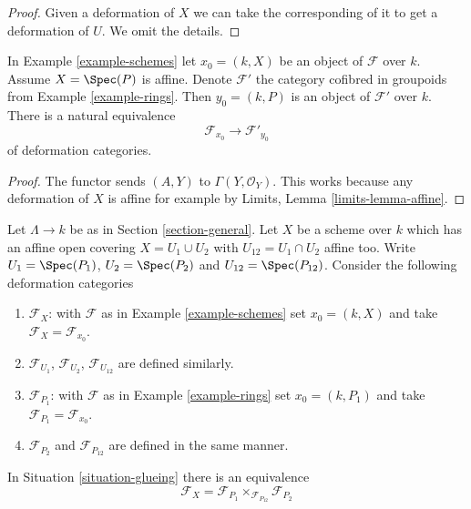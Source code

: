 \begin{proof}
Given a deformation of $X$ we can take the corresponding
of it to get a deformation of $U$. We omit the details.
\end{proof}

\begin{lemma}
\label{lemma-affine}
In Example \ref{example-schemes} let $x_0 = (k, X)$ be an object
of $\mathcal{F}$ over $k$. Assume $X = \Spec(P)$ is affine.
Denote $\mathcal{F}'$ the category cofibred in groupoids
from Example \ref{example-rings}. Then $y_0 = (k, P)$
is an object of $\mathcal{F}'$ over $k$.
There is a natural equivalence
$$
\mathcal{F}_{x_0} \longrightarrow \mathcal{F}'_{y_0}
$$
of deformation categories.
\end{lemma}

\begin{proof}
The functor sends $(A, Y)$ to $\Gamma(Y, \mathcal{O}_Y)$.
This works because
any deformation of $X$ is affine for example by
Limits, Lemma \ref{limits-lemma-affine}.
\end{proof}

\begin{situation}
\label{situation-glueing}
Let $\Lambda \to k$ be as in Section \ref{section-general}.
Let $X$ be a scheme over $k$ which has an affine open covering
$X = U_1 \cup U_2$ with $U_{12} = U_1 \cap U_2$ affine too.
Write $U_1 = \Spec(P_1)$, $U_2 = \Spec(P_2)$ and $U_{12} = \Spec(P_{12})$.
Consider the following deformation categories
\begin{enumerate}
\item $\mathcal{F}_X$: with $\mathcal{F}$ as in
Example \ref{example-schemes} set $x_0 = (k, X)$ and
take $\mathcal{F}_X = \mathcal{F}_{x_0}$.
\item $\mathcal{F}_{U_1}$, $\mathcal{F}_{U_2}$, $\mathcal{F}_{U_{12}}$
are defined similarly.
\item $\mathcal{F}_{P_1}$: with $\mathcal{F}$ as in
Example \ref{example-rings} set $x_0 = (k, P_1)$ and
take $\mathcal{F}_{P_1} = \mathcal{F}_{x_0}$.
\item $\mathcal{F}_{P_2}$ and $\mathcal{F}_{P_{12}}$
are defined in the same manner.
\end{enumerate}
\end{situation}

\begin{lemma}
\label{lemma-glueing}
In Situation \ref{situation-glueing}
there is an equivalence
$$
\mathcal{F}_X = \mathcal{F}_{P_1} \times_{\mathcal{F}_{P_{12}}}
\mathcal{F}_{P_2}
$$
\end{lemma}

